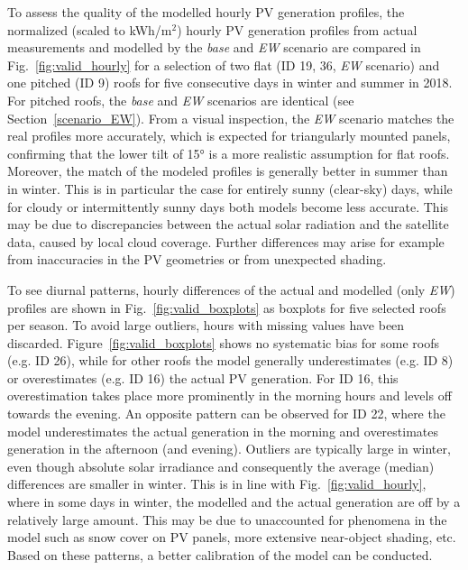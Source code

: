 To assess the quality of the modelled hourly PV generation profiles, the normalized (scaled to kWh/m$^2$) hourly PV generation profiles from actual measurements and modelled by the \textit{base} and \textit{EW} scenario are compared in Fig.~\ref{fig:valid_hourly} for a selection of two flat (ID 19, 36, \textit{EW} scenario) and one pitched (ID 9) roofs for five consecutive days in winter and summer in 2018. For pitched roofs, the \textit{base} and \textit{EW} scenarios are identical (see Section~\ref{scenario_EW}). From a visual inspection, the \textit{EW} scenario matches the real profiles more accurately, which is expected for triangularly mounted panels, confirming that the lower tilt of 15° is a more realistic assumption for flat roofs. Moreover, the match of the modeled profiles is generally better in summer than in winter. This is in particular the case for entirely sunny (clear-sky) days, while for cloudy or intermittently sunny days both models become less accurate. This may be due to discrepancies between the actual solar radiation and the satellite data, caused by local cloud coverage. Further differences may arise for example from inaccuracies in the PV geometries or from unexpected shading.

To see diurnal patterns, hourly differences of the actual and modelled (only \textit{EW}) profiles are shown in Fig.~\ref{fig:valid_boxplots} as boxplots for five selected roofs per season. To avoid large outliers, hours with missing values have been discarded. Figure~\ref{fig:valid_boxplots} shows no systematic bias for some roofs (e.g. ID 26), while for other roofs the model generally underestimates (e.g. ID 8) or overestimates (e.g. ID 16) the actual PV generation. For ID 16, this overestimation takes place more prominently in the morning hours and levels off towards the evening. An opposite pattern can be observed for ID 22, where the model underestimates the actual generation in the morning and overestimates generation in the afternoon (and evening). Outliers are typically large in winter, even though absolute solar irradiance and consequently the average (median) differences are smaller in winter. This is in line with Fig.~\ref{fig:valid_hourly}, where in some days in winter, the modelled and the actual generation are off by a relatively large amount. This may be due to unaccounted for phenomena in the model such as snow cover on PV panels, more extensive near-object shading, etc. Based on these patterns, a better calibration of the model can be conducted. 

